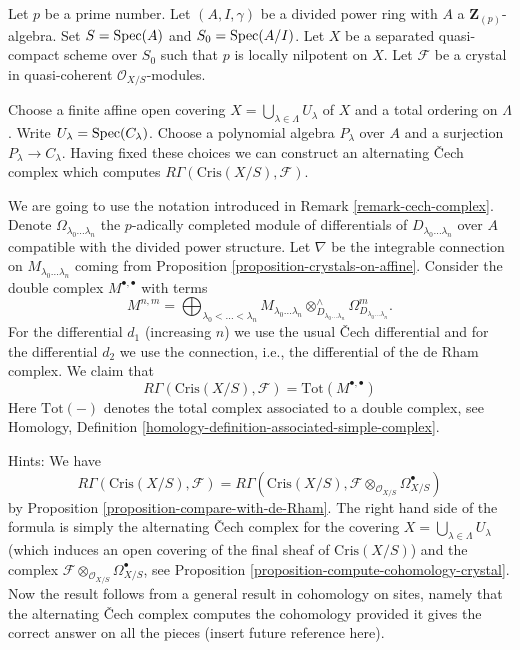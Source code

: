 \begin{remark}
\label{remark-alternating-cech-complex}
Let $p$ be a prime number. Let $(A, I, \gamma)$ be a divided power
ring with $A$ a $\mathbf{Z}_{(p)}$-algebra. Set $S = \mathop{\mathrm{Spec}}(A)$ and
$S_0 = \mathop{\mathrm{Spec}}(A/I)$. Let $X$ be a separated quasi-compact scheme
over $S_0$ such that $p$ is locally nilpotent on $X$. Let
$\mathcal{F}$ be a crystal in quasi-coherent $\mathcal{O}_{X/S}$-modules.

\medskip\noindent
Choose a finite affine open covering
$X = \bigcup_{\lambda \in \Lambda} U_\lambda$ of $X$
and a total ordering on $\Lambda$.
Write $U_\lambda = \mathop{\mathrm{Spec}}(C_\lambda)$. Choose a polynomial algebra
$P_\lambda$ over $A$ and a surjection $P_\lambda \to C_\lambda$.
Having fixed these choices we can construct an alternating
{\v C}ech complex which computes $R\Gamma(\text{Cris}(X/S), \mathcal{F})$.

\medskip\noindent
We are going to use the notation introduced in
Remark \ref{remark-cech-complex}.
Denote $\Omega_{\lambda_0 \ldots \lambda_n}$
the $p$-adically completed module of differentials of
$D_{\lambda_0 \ldots \lambda_n}$ over $A$ compatible with the divided power
structure. Let $\nabla$ be the integrable connection on
$M_{\lambda_0 \ldots \lambda_n}$ coming from
Proposition \ref{proposition-crystals-on-affine}.
Consider the double complex $M^{\bullet, \bullet}$ with
terms
$$
M^{n, m} =
\bigoplus\nolimits_{\lambda_0 < \ldots < \lambda_n}
M_{\lambda_0 \ldots \lambda_n}
\otimes^\wedge_{D_{\lambda_0 \ldots \lambda_n}}
\Omega^m_{D_{\lambda_0 \ldots \lambda_n}}.
$$
For the differential $d_1$ (increasing $n$) we use the usual
{\v C}ech differential and for the differential $d_2$ we use
the connection, i.e., the differential of the de Rham complex.
We claim that
$$
R\Gamma(\text{Cris}(X/S), \mathcal{F}) = \text{Tot}(M^{\bullet, \bullet})
$$
Here $\text{Tot}(-)$ denotes the total complex associated to a
double complex, see
Homology, Definition \ref{homology-definition-associated-simple-complex}.

\medskip\noindent
Hints: We have
$$
R\Gamma(\text{Cris}(X/S), \mathcal{F}) = R\Gamma(\text{Cris}(X/S),
\mathcal{F} \otimes_{\mathcal{O}_{X/S}} \Omega_{X/S}^\bullet)
$$
by Proposition \ref{proposition-compare-with-de-Rham}.
The right hand side of the formula is simply the alternating {\v C}ech complex
for the covering $X = \bigcup_{\lambda \in \Lambda} U_\lambda$
(which induces an open covering of the final sheaf of $\text{Cris}(X/S)$)
and the complex $\mathcal{F} \otimes_{\mathcal{O}_{X/S}} \Omega_{X/S}^\bullet$,
see Proposition \ref{proposition-compute-cohomology-crystal}.
Now the result follows from a general result in cohomology on sites,
namely that the alternating {\v C}ech complex computes the cohomology
provided it gives the correct answer on all the pieces (insert future
reference here).
\end{remark}

